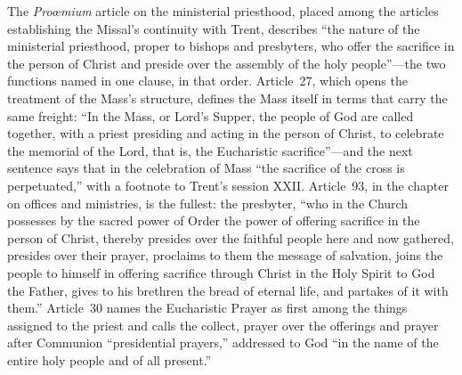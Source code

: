The \emph{Proœmium} article on the ministerial priesthood, placed among the articles establishing the Missal's continuity with Trent, describes ``the nature of the ministerial priesthood, proper to bishops and presbyters, who offer the sacrifice in the person of Christ and preside over the assembly of the holy people''---the two functions named in one clause, in that order. Article~27, which opens the treatment of the Mass's structure, defines the Mass itself in terms that carry the same freight: ``In the Mass, or Lord's Supper, the people of God are called together, with a priest presiding and acting in the person of Christ, to celebrate the memorial of the Lord, that is, the Eucharistic sacrifice''---and the next sentence says that in the celebration of Mass ``the sacrifice of the cross is perpetuated,'' with a footnote to Trent's session XXII. Article~93, in the chapter on offices and ministries, is the fullest: the presbyter, ``who in the Church possesses by the sacred power of Order the power of offering sacrifice in the person of Christ, thereby presides over the faithful people here and now gathered, presides over their prayer, proclaims to them the message of salvation, joins the people to himself in offering sacrifice through Christ in the Holy Spirit to God the Father, gives to his brethren the bread of eternal life, and partakes of it with them.'' Article~30 names the Eucharistic Prayer as first among the things assigned to the priest and calls the collect, prayer over the offerings and prayer after Communion ``presidential prayers,'' addressed to God ``in the name of the entire holy people and of all present.''


